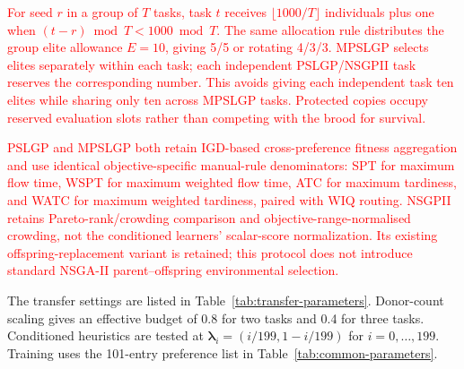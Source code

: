 \documentclass[10pt,journal]{IEEEtran}
\newcommand{\key}[1]{\textcolor{red}{#1}}
\begin{document}
\key{For seed $r$ in a group of $T$ tasks, task $t$ receives $\lfloor1000/T\rfloor$ individuals plus one when $(t-r)\bmod T < 1000\bmod T$. The same allocation rule distributes the group elite allowance $E=10$, giving 5/5 or rotating 4/3/3. MPSLGP selects elites separately within each task; each independent PSLGP/NSGPII task reserves the corresponding number. This avoids giving each independent task ten elites while sharing only ten across MPSLGP tasks. Protected copies occupy reserved evaluation slots rather than competing with the brood for survival.}

\key{PSLGP and MPSLGP both retain IGD-based cross-preference fitness aggregation and use identical objective-specific manual-rule denominators: SPT for maximum flow time, WSPT for maximum weighted flow time, ATC for maximum tardiness, and WATC for maximum weighted tardiness, paired with WIQ routing. NSGPII retains Pareto-rank/crowding comparison and objective-range-normalised crowding, not the conditioned learners' scalar-score normalization. Its existing offspring-replacement variant is retained; this protocol does not introduce standard NSGA-II parent--offspring environmental selection.}

The transfer settings are listed in Table~\ref{tab:transfer-parameters}. Donor-count scaling gives an effective budget of 0.8 for two tasks and 0.4 for three tasks. Conditioned heuristics are tested at $\boldsymbol{\lambda}_i=(i/199,1-i/199)$ for $i=0,\ldots,199$. Training uses the 101-entry preference list in Table~\ref{tab:common-parameters}.

\end{document}
